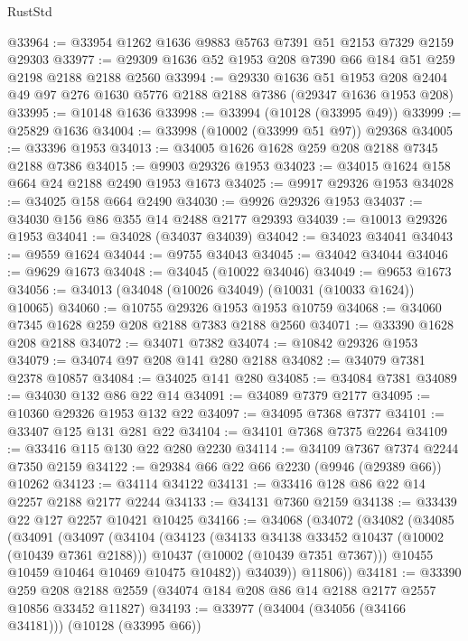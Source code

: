 \begin{lexlean}{RustStd}
\begin{coremodule}
@33964 := @33954 @1262 @1636 @9883 @5763 @7391 @51 @2153 @7329 @2159 @29303
@33977 := @29309 @1636 @52 @1953 @208 @7390 @66 @184 @51 @259 @2198 @2188 @2188 @2560
@33994 := @29330
    @1636
    @51
    @1953
    @208
    @2404
    @49
    @97
    @276
    @1630
    @5776
    @2188
    @2188
    @7386
    (@29347 @1636 @1953 @208)
@33995 := @10148 @1636
@33998 := @33994 (@10128 (@33995 @49))
@33999 := @25829 @1636
@34004 := @33998 (@10002 (@33999 @51 @97)) @29368
@34005 := @33396 @1953
@34013 := @34005 @1626 @1628 @259 @208 @2188 @7345 @2188 @7386
@34015 := @9903 @29326 @1953
@34023 := @34015 @1624 @158 @664 @24 @2188 @2490 @1953 @1673
@34025 := @9917 @29326 @1953
@34028 := @34025 @158 @664 @2490
@34030 := @9926 @29326 @1953
@34037 := @34030 @156 @86 @355 @14 @2488 @2177 @29393
@34039 := @10013 @29326 @1953
@34041 := @34028 (@34037 @34039)
@34042 := @34023 @34041
@34043 := @9559 @1624
@34044 := @9755 @34043
@34045 := @34042 @34044
@34046 := @9629 @1673
@34048 := @34045 (@10022 @34046)
@34049 := @9653 @1673
@34056 := @34013 (@34048 (@10026 @34049) (@10031 (@10033 @1624)) @10065)
@34060 := @10755 @29326 @1953 @1953 @10759
@34068 := @34060 @7345 @1628 @259 @208 @2188 @7383 @2188 @2560
@34071 := @33390 @1628 @208 @2188
@34072 := @34071 @7382
@34074 := @10842 @29326 @1953
@34079 := @34074 @97 @208 @141 @280 @2188
@34082 := @34079 @7381 @2378 @10857
@34084 := @34025 @141 @280
@34085 := @34084 @7381
@34089 := @34030 @132 @86 @22 @14
@34091 := @34089 @7379 @2177
@34095 := @10360 @29326 @1953 @132 @22
@34097 := @34095 @7368 @7377
@34101 := @33407 @125 @131 @281 @22
@34104 := @34101 @7368 @7375 @2264
@34109 := @33416 @115 @130 @22 @280 @2230
@34114 := @34109 @7367 @7374 @2244 @7350 @2159
@34122 := @29384 @66 @22 @66 @2230 (@9946 (@29389 @66)) @10262
@34123 := @34114 @34122
@34131 := @33416 @128 @86 @22 @14 @2257 @2188 @2177 @2244
@34133 := @34131 @7360 @2159
@34138 := @33439 @22 @127 @2257 @10421 @10425
@34166 := @34068
    (@34072
      (@34082
        (@34085
          (@34091
            (@34097
              (@34104
                (@34123
                  (@34133 @34138 @33452 @10437 (@10002 (@10439 @7361 @2188)))
                  @10437
                  (@10002 (@10439 @7351 @7367)))
                @10455
                @10459
                @10464
                @10469
                @10475
                @10482))
            @34039))
        @11806))
@34181 := @33390
    @259
    @208
    @2188
    @2559
    (@34074 @184 @208 @86 @14 @2188 @2177 @2557 @10856 @33452 @11827)
@34193 := @33977
    (@34004 (@34056 (@34166 @34181)))
    (@10128 (@33995 @66))

\end{coremodule}
\end{lexlean}
